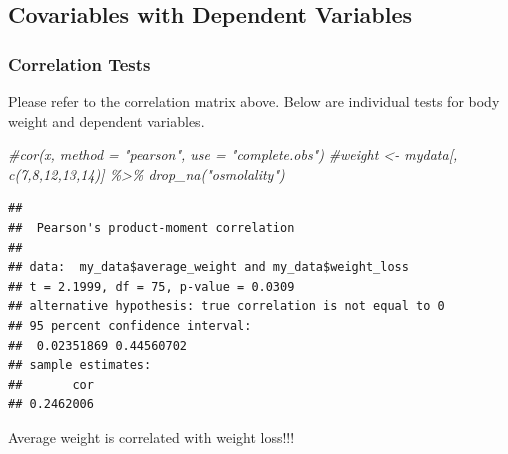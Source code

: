 \documentclass[
]{article}
\newenvironment{Shaded}{\begin{snugshade}}{\end{snugshade}}
\newcommand{\AttributeTok}[1]{\textcolor[rgb]{0.77,0.63,0.00}{#1}}
\newcommand{\CommentTok}[1]{\textcolor[rgb]{0.56,0.35,0.01}{\textit{#1}}}
\newcommand{\FunctionTok}[1]{\textcolor[rgb]{0.00,0.00,0.00}{#1}}
\newcommand{\NormalTok}[1]{#1}
\newcommand{\SpecialCharTok}[1]{\textcolor[rgb]{0.00,0.00,0.00}{#1}}
\newcommand{\StringTok}[1]{\textcolor[rgb]{0.31,0.60,0.02}{#1}}
\begin{document}
\hypertarget{covariables-with-dependent-variables}{%
\subsection{Covariables with Dependent
Variables}\label{covariables-with-dependent-variables}}

\hypertarget{correlation-tests}{%
\subsubsection{Correlation Tests}\label{correlation-tests}}

Please refer to the correlation matrix above. Below are individual tests
for body weight and dependent variables.

\begin{Shaded}
\begin{Highlighting}[]
\CommentTok{\#cor(x, method = "pearson", use = "complete.obs")}
\CommentTok{\#weight \textless{}{-} mydata[, c(7,8,12,13,14)] \%\textgreater{}\% drop\_na("osmolality")}
\end{Highlighting}
\end{Shaded}

\begin{Shaded}
\end{Shaded}

\begin{verbatim}
## 
##  Pearson's product-moment correlation
## 
## data:  my_data$average_weight and my_data$weight_loss
## t = 2.1999, df = 75, p-value = 0.0309
## alternative hypothesis: true correlation is not equal to 0
## 95 percent confidence interval:
##  0.02351869 0.44560702
## sample estimates:
##       cor 
## 0.2462006
\end{verbatim}

Average weight is correlated with weight loss!!!

\begin{Shaded}
\end{Shaded}
\end{document}
